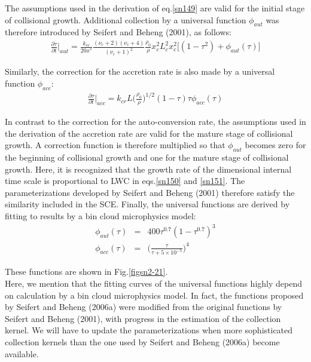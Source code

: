The assumptions used in the derivation of eq.\ref{sn149} are valid for the initial stage of collisional growth. Additional collection by a universal function $\phi_{aut}$ was therefore introduced by Seifert and Beheng (2001), as follows:
\begin{eqnarray}
\frac{\partial \tau}{\partial t}\Bigr|_{aut}=\frac{k_{cc}}{20x^{*}}\frac{(\nu_{c}+2)(\nu_{c}+4)}{(\nu_{c}+1)^{2}}\frac{\rho_{0}}{\rho}x_{c}^{2}L_{c}^{2}x_{c}^{2}\bigl[(1-\tau^{2})+\phi_{aut}(\tau)\bigr]\label{sn150}
\end{eqnarray}

Similarly, the correction for the accretion rate is also made by a universal function $\phi_{acc}$:
\begin{eqnarray}
\frac{\partial \tau}{\partial t}\Bigr|_{acc}=k_{cr}L\bigl(\frac{\rho_{0}}{\rho}\bigr)^{1/2}(1-\tau)\tau\phi_{acc}(\tau)\label{sn151}
\end{eqnarray}

In contrast to the correction for the auto-conversion rate, the assumptions used in the derivation of the accretion rate are valid for the mature stage of collisional growth. A correction function is therefore multiplied so that $\phi_{aut}$ becomes zero for the beginning of collisional growth and one for the mature stage of collisional growth. Here, it is recognized that the growth rate of the dimensional internal time scale is proportional to LWC in eqs.\ref{sn150} and \ref{sn151}. The parameterizations developed by Seifert and Beheng (2001) therefore satisfy the similarity included in the SCE. Finally, the universal functions are derived by fitting to results by a bin cloud microphysics model:
\begin{eqnarray}
\phi_{aut}(\tau)&=&400\tau^{0.7}(1-\tau^{0.7})^{3}\label{152}\\
\phi_{acc}(\tau)&=&\bigl(\frac{\tau}{\tau+5\times 10^{-5}}\bigr)^{4}\label{153}
\end{eqnarray}

These functions are shown in Fig.\ref{figsn2-21}.\\
Here, we mention that the fitting curves of the universal functions highly depend on calculation by a bin cloud microphysics model. In fact, the functions proposed by Seifert and Beheng (2006a) were modified from the original functions by Seifert and Beheng (2001), with progress in the estimation of the collection kernel. We will have to update the parameterizations when more sophisticated collection kernels than the one used by Seifert and Beheng (2006a) become available.

